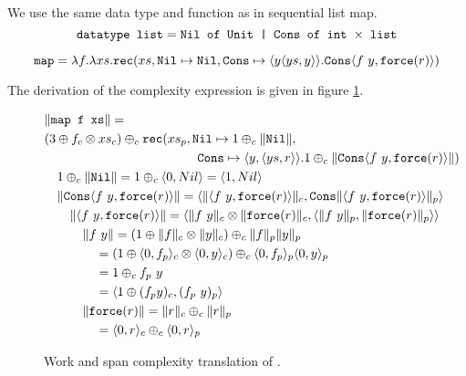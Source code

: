 We use the same data type  and  function as in sequential list map.
\begin{equation*}
  \texttt{datatype list} = \texttt{Nil of Unit | Cons of int $\times$ list}
\end{equation*}

\begin{equation*}
  \texttt{map} = \lambda f. \lambda xs . \texttt{rec}(xs, \texttt{Nil} \mapsto \texttt{Nil}, \texttt{Cons} \mapsto \langle y \langle ys, y \rangle\rangle. \texttt{Cons}\langle f\ y, \texttt{force}(r)\rangle)
\end{equation*}

The derivation of the complexity expression is given in figure \ref{fig:ws_map_complexity_translation}.
\begin{figure}
  \label{fig:ws_map_complexity_translation}
  \caption{Work and span complexity translation of .}
  \[\begin{split}
    &\|\T{map f xs}\| = \\
    &  (3 \oplus f_c \otimes xs_c) \oplus_c \T{rec}(xs_p, \T{Nil}\mapsto 1 \oplus_c \|\T{Nil}\|, \\
    &\quadten\qquad \T{Cons} \mapsto \langle y, \langle ys, r \rangle \rangle. 1 \oplus_c \|\T{Cons}\langle f\ y, \T{force}(r)\rangle \|) \\
    &\quad 1 \oplus_c \|\T{Nil}\| = 1 \oplus_c \langle 0, Nil \rangle = \langle 1, Nil \rangle \\
    &\quad\|\T{Cons}\langle f\ y, \T{force}(r)\rangle \| = \langle \|\langle f\ y, \T{force}(r)\rangle\|_c, \T{Cons} \| \langle f\ y, \T{force}(r)\rangle \|_p\rangle \\
    &\qquad \|\langle f\ y, \T{force}(r)\rangle\| = \langle \|f\ y\|_c \otimes \|\T{force}(r)\|_c, \langle \|f\ y\|_p, \|\T{force}(r)\|_p\rangle\rangle \\
    &\quadthree \|f\ y\| = (1 \oplus \|f\|_c \otimes \|y\|_c) \oplus_c \|f\|_p \|y\|_p \\
    &\quadfour = (1 \oplus \langle 0, f_p \rangle_c \otimes \langle 0, y \rangle_c) \oplus_c \langle 0, f_p \rangle_p \langle 0, y \rangle_p \\
    &\quadfour = 1 \oplus_c f_p\ y \\
    &\quadfour = \langle 1 \oplus (f_p y)_c, (f_p\ y)_p \rangle \\
    &\quadthree \|\T{force}(r)\| = \|r\|_c \oplus_c \|r\|_p \\
    &\quadfour = \langle 0, r \rangle_c \oplus_c \langle 0, r \rangle_p \\

\end{split}\]
\end{figure}
